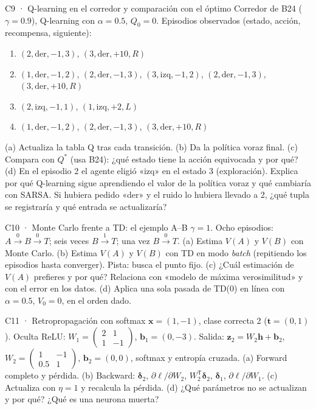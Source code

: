\begin{ejercicio}{C9 · Q-learning en el corredor y comparación con el óptimo }
Corredor de B24 ($\gamma=0.9$), Q-learning con $\alpha=0.5$, $Q_0=0$. Episodios observados (estado, acción, recompensa, siguiente):
\begin{enumerate}[label=Ep.\,\arabic*:,leftmargin=3em]
\item $(2,\text{der},-1,3)$, $(3,\text{der},+10,R)$
\item $(1,\text{der},-1,2)$, $(2,\text{der},-1,3)$, $(3,\text{izq},-1,2)$, $(2,\text{der},-1,3)$, $(3,\text{der},+10,R)$
\item $(2,\text{izq},-1,1)$, $(1,\text{izq},+2,L)$
\item $(1,\text{der},-1,2)$, $(2,\text{der},-1,3)$, $(3,\text{der},+10,R)$
\end{enumerate}
(a)  Actualiza la tabla Q tras cada transición. (b)  Da la política voraz final.
(c)  Compara con $Q^*$ (usa B24): ¿qué estado tiene la acción equivocada y por qué?
(d)  En el episodio 2 el agente eligió «izq» en el estado 3 (exploración). Explica por qué Q-learning sigue
aprendiendo el valor de la política voraz y qué cambiaría con SARSA. Si hubiera pedido «der» y el ruido lo hubiera llevado a 2,
¿qué tupla se registraría y qué entrada se actualizaría?
\end{ejercicio}

\begin{ejercicio}{C10 · Monte Carlo frente a TD: el ejemplo A–B }
$\gamma=1$. Ocho episodios: $A\xrightarrow{0}B\xrightarrow{0}T$; seis veces $B\xrightarrow{1}T$; una vez $B\xrightarrow{0}T$.
(a)  Estima $V(A)$ y $V(B)$ con Monte Carlo.
(b)  Estima $V(A)$ y $V(B)$ con TD en modo \emph{batch} (repitiendo los episodios hasta converger). Pista: busca el punto fijo.
(c)  ¿Cuál estimación de $V(A)$ prefieres y por qué? Relaciona con «modelo de máxima verosimilitud» y con el error en los datos.
(d)  Aplica una sola pasada de TD(0) en línea con $\alpha=0.5$, $V_0=0$, en el orden dado.
\end{ejercicio}

\begin{ejercicio}{C11 · Retropropagación con softmax }
$\mathbf x=(1,-1)$, clase correcta 2 ($\mathbf t=(0,1)$). Oculta ReLU: $W_1=\begin{pmatrix}2&1\\1&-1\end{pmatrix}$, $\mathbf b_1=(0,-3)$.
Salida: $\mathbf z_2=W_2\mathbf h+\mathbf b_2$, $W_2=\begin{pmatrix}1&-1\\0.5&1\end{pmatrix}$, $\mathbf b_2=(0,0)$, softmax y entropía cruzada.
(a)  Forward completo y pérdida. (b)  Backward: $\boldsymbol\delta_2$, $\partial\ell/\partial W_2$, $W_2^\mathsf T\boldsymbol\delta_2$, $\boldsymbol\delta_1$, $\partial\ell/\partial W_1$.
(c)  Actualiza con $\eta=1$ y recalcula la pérdida. (d)  ¿Qué parámetros no se actualizan y por qué? ¿Qué es una neurona muerta?
\end{ejercicio}

